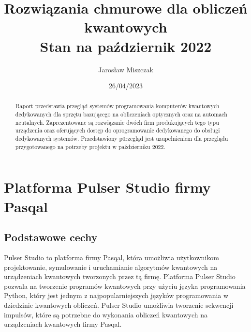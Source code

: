 \documentclass[a4paper,12pt
]{article}
\begin{document}
\title{Rozwiązania chmurowe dla obliczeń
kwantowych\\ {\normalsize Stan na październik
2022}}

\author{Jarosław Miszczak}
\date{26/04/2023}

\maketitle

\begin{abstract}
Raport przedstawia przegląd systemów programowania komputerów kwantowych
dedykowanych dla sprzętu bazującego na obliczeniach optycznych oraz na
automach neutalnych. Zaprezentowane są rozwiązanie dwóch firm
produkujących tego typu urządzenia oraz oferujących dostęp do
oprogramowanie dedykowanego do obsługi dedykowanych systemów.
Przedstawiony p0rzegląd jest uzupełnieniem dla przeglądu przygotowanego na potrzeby projektu w październiku 2022.
\end{abstract}


\hypertarget{platforma-pulser-studio-firmy-pasqal}{%
\section{Platforma Pulser Studio firmy
Pasqal}\label{platforma-pulser-studio-firmy-pasqal}}

\hypertarget{podstawowe-cechy}{%
\subsection{Podstawowe cechy}\label{podstawowe-cechy}}

Pulser Studio to platforma firmy Pasqal, która umożliwia użytkownikom
projektowanie, symulowanie i uruchamianie algorytmów kwantowych na
urządzeniach kwantowych tworzonych przez tą firmę. Platforma Pulser
Studio pozwala na tworzenie programów kwantowych przy użyciu języka
programowania Python, który jest jednym z najpopularniejszych języków
programowania w dziedzinie kwantowych obliczeń. Pulser Studio umożliwia
tworzenie sekwencji impulsów, które są potrzebne do wykonania obliczeń
kwantowych na urządzeniach kwantowych firmy Pasqal.
\end{document}
